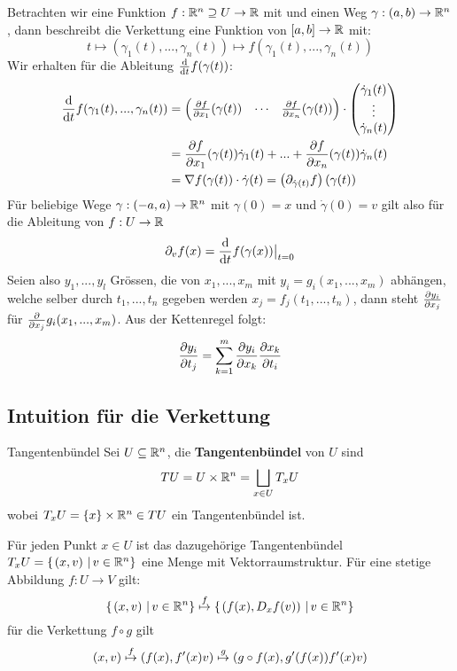 \begin{example} Betrachten wir eine Funktion $f: \mathbb{R}^n \supseteq U \to \mathbb{R}$ mit  und einen Weg $\gamma: (a, b) \to \mathbb{R}^n$, dann beschreibt die Verkettung eine Funktion von $[a,b] \to \mathbb{R}$ mit:
$$t \mapsto (\gamma_1(t), ..., \gamma_n(t)) \mapsto f(\gamma_1(t), ...,\gamma_n(t))$$
Wir erhalten für die Ableitung $\diff{}{t}f(\gamma(t))$:
\begin{align*}
    \diff{}{t}f(\gamma_1(t), ..., \gamma_n(t)) &= \mat{
    \diffp{f}{x_1}(\gamma(t)) & \cdots & \diffp{f}{x_n}(\gamma(t))
    }\cdot\mat{
    \Dot{\gamma}_1(t) \\ \vdots \\ \Dot{\gamma}_n(t)
    }\\
    &= \diffp{f}{x_1}(\gamma(t))\Dot{\gamma}_1(t) + ... + \diffp{f}{x_n}(\gamma(t))\Dot{\gamma}_n(t)\\
    &= \nabla f(\gamma(t)) \cdot \Dot{\gamma}(t) = \bk{\partial_{\Dot{\gamma}(t)}f}\bk{\gamma(t)}
\end{align*}
Für beliebige Wege $\gamma : (-a, a) \to \mathbb{R}^n$ mit $\gamma(0) = x$ und $\Dot{\gamma}(0) = v$ gilt also für die Ableitung von $f: U \to \mathbb{R}$ 
$$\partial_vf(x) = \diff{}{t}f(\gamma(x))\big\vert_{t=0}$$
Seien also $y_1,...,y_l$ Grössen, die von $x_1,...,x_m$ mit $y_i = g_i(x_1,...,x_m)$ abhängen, welche selber durch $t_1, ..., t_n$ gegeben werden  $x_j = f_j(t_1,...,t_n)$, dann steht $\diffp{y_i}{x_j}$ für $\diffp{}{x_j}g_i(x_1,...,x_m)$. Aus der Kettenregel folgt:
$$\diffp{y_i}{t_j} = \sum_{k=1}^m \diffp{y_i}{x_k}\diffp{x_k}{t_i}$$
\end{example}

\subsection{Intuition für die Verkettung}
\begin{definition}{Tangentenbündel}{}
Sei $U \subseteq \mathbb{R}^n$, die \textbf{Tangentenbündel} von $U$ sind
$$TU = U \times \mathbb{R}^n = \bigsqcup_{x \in U} T_xU$$
wobei $T_xU =\{x\} \times \mathbb{R}^n \in TU$ ein Tangentenbündel ist.
\end{definition}
Für jeden Punkt $x \in U$ ist das dazugehörige Tangentenbündel $T_xU = \left\{\left.(x, v) \ \right| v \in \mathbb{R}^n \right\}$ eine Menge mit Vektorraumstruktur. Für eine stetige Abbildung $f: U \to V$ gilt:
$$\left\{\left.(x, v) \ \right| v \in \mathbb{R}^n \right\} \stackrel{f}{\mapsto} \left\{\left.(f(x), D_xf(v) ) \ \right| v \in \mathbb{R}^n \right\}$$
für die Verkettung $f\circ g$ gilt
$$(x,v) \stackrel{f}{\mapsto} \left(f(x), f'(x) v\right) \stackrel{g}{\mapsto} \left(g\circ f(x), g'(f(x))f'(x) v\right)$$

